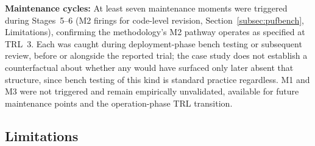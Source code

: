 \documentclass[preprint,12pt,authoryear]{elsarticle}
\begin{document}
\textbf{Maintenance cycles:} At least seven maintenance moments were triggered during Stages~5--6 (M2 firings for code-level revision, Section~\ref{subsec:pufbench}, Limitations), confirming the methodology's M2 pathway operates as specified at TRL~3. Each was caught during deployment-phase bench testing or subsequent review, before or alongside the reported trial; the case study does not establish a counterfactual about whether any would have surfaced only later absent that structure, since bench testing of this kind is standard practice regardless. M1 and M3 were not triggered and remain empirically unvalidated, available for future maintenance points and the operation-phase TRL transition.

\subsection{Limitations}
\label{subsec:limitations}
\end{document}
